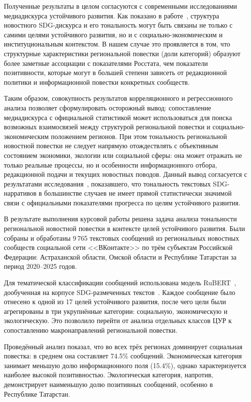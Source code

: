 \documentclass[master, och, coursework]{SCWorks1}
\begin{document}
Полученные результаты в целом согласуются с современными исследованиями медиадискурса устойчивого развития. Как показано в работе~\cite{Sufi2025}, структура новостного SDG-дискурса и его тональность могут быть связаны не только с самими целями устойчивого развития, но и с социально-экономическим и институциональным контекстом. В нашем случае это проявляется в том, что структурные характеристики региональной повестки (доли категорий) образуют более заметные ассоциации с показателями Росстата, чем показатели позитивности, которые могут в большей степени зависеть от редакционной политики и информационной повестки конкретных сообществ.

Таким образом, совокупность результатов корреляционного и регрессионного  анализа позволяет сформулировать осторожный вывод: сопоставление медиадискурса с официальной статистикой может использоваться для поиска возможных взаимосвязей между структурой региональной повестки и социально-экономическим положением регионов. При этом тональность региональной новостной повестки не следует напрямую отождествлять с объективным состоянием экономики, экологии или социальной сферы: она может отражать не только реальные процессы, но и особенности информационного отбора, редакционной подачи и текущих новостных поводов. Данный вывод согласуется с результатами исследования~\cite{Funk2024}, показавшего, что тональность текстовых SDG-нарративов в большинстве случаев не имеет прямой статистически значимой связи с официальными показателями прогресса по целям устойчивого развития.

\conclusion

В результате выполнения курсовой работы решена задача анализа тональности региональной новостной повестки в контексте целей устойчивого развития. Были собраны и обработаны 9\,765 текстовых сообщений из региональных новостных сообществ социальной сети <<ВКонтакте>> по трём субъектам Российской Федерации: Астраханской области, Омской области и Республике Татарстан за период 2020--2025 годов.

Для тематической классификации сообщений использована модель RuBERT~\cite{Kuratov2019}, дообученная на корпусе SDG-размеченных текстов~\cite{Morozov2025}. Каждое сообщение было отнесено к одной из 17 целей устойчивого развития, после чего цели были агрегированы в три укрупнённые категории: социальную, экономическую и экологическую. Это позволило перейти от анализа отдельных классов ЦУР к сопоставлению макронаправлений региональной повестки.

Проведённый анализ показал, что во всех трёх регионах доминирует социальная повестка: в среднем она составляет 74.5\% сообщений. Экономическая категория занимает меньшую долю информационного поля (15.4\%), однако характеризуется наиболее высокой позитивностью. Экологическая категория, напротив, демонстрирует наименьшую долю позитивных сообщений, особенно в Республике Татарстан.
\end{document}
